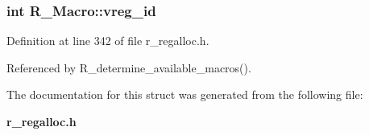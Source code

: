 \subsubsection{\setlength{\rightskip}{0pt plus 5cm}int \bf{R\_\-Macro::vreg\_\-id}}\label{structR__Macro_32d56d5ad6183929a67fd264523d71b3}




Definition at line 342 of file r\_\-regalloc.h.

Referenced by R\_\-determine\_\-available\_\-macros().

The documentation for this struct was generated from the following file:\begin{CompactItemize}
\item 
\bf{r\_\-regalloc.h}\end{CompactItemize}
